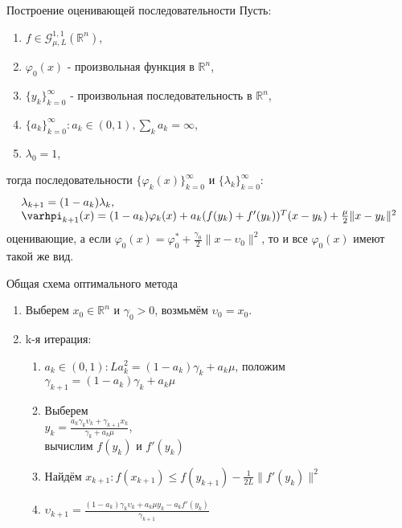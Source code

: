 \documentclass[14pt, fleqn, xcolor={dvipsnames, table}]{beamer}
\begin{document}
\begin{frame}{Построение оценивающей последовательности}
\small
Пусть:
\begin{enumerate}
  \item $f \in \mathcal{G}_{\mu, L}^{1,1}(\mathbb{R}^n)$,
  \item $\varphi_0(x)$ - произвольная функция в $\mathbb{R}^n$,
  \item $\{y_k\}_{k=0}^{\infty}$ - произвольная последовательность в $\mathbb{R}^n$,
  \item $\{a_k\}_{k=0}^{\infty}: a_k \in (0,1), \sum_ka_k = \infty$,
  \item $\lambda_0=1$,
\end{enumerate}
тогда последовательности $\{\varphi_k(x)\}_{k=0}^{\infty}$ и $\{\lambda_k\}_{k=0}^{\infty}$:
 $$\begin{array}{l}
  \lambda_{k+1} = (1 - a_k)\lambda_k, \\
  \varhpi_{k+1}(x) = (1 - a_k)\varphi_k(x) + a_k(f(y_k) + f'(y_k))^T(x-y_k) + \frac{\mu}{2}\|x - y_k\|^2
\end{array}$$
оценивающие, а если $\varphi_0(x) = \varphi_0^* + \frac{\gamma_0}{2}\|x - \upsilon_0\|^2$, то и все $\varphi_0(x)$ имеют такой же вид.
\end{frame}

\begin{frame}{Общая схема оптимального метода}
\begin{enumerate}
  \item Выберем $x_0 \in \mathbb{R}^n$ и $\gamma_0 > 0$, возмьмём $\upsilon_0=x_0$.
  \item k-я итерация:
  \begin{enumerate}
    \item $a_k \in (0,1): La_k^2 = (1-a_k)\gamma_k + a_k\mu$, положим $\gamma_{k+1} = (1-a_k)\gamma_k + a_k\mu$
    \item Выберем  \\ 
    $y_k = \frac{a_k\gamma_k\upsilon_k + \gamma_{k+1}x_k}{\gamma_k + a_k\mu}$, \\
     вычислим $f(y_k)$ и $f'(y_k)$
    \item Найдём $x_{k+1} : f(x_{k+1}) \le f(y_{k+1}) - \frac{1}{2L}\|f'(y_k)\|^2$
    \item $\upsilon_{k+1} = \frac{(1-a_k)\gamma_k\upsilon_k + a_k\mu y_k - a_kf'(y_k)}{\gamma_{k+1}}$
  \end{enumerate}
\end{enumerate}
\end{frame}
\end{document}
